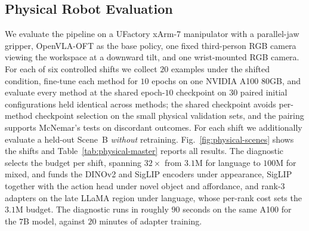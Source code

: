 

\subsection{Physical Robot Evaluation}
\label{sec:exp-physical}

We evaluate the pipeline on a UFactory xArm-7 manipulator with a parallel-jaw gripper, OpenVLA-OFT as the base policy, one fixed third-person RGB camera viewing the workspace at a downward tilt, and one wrist-mounted RGB camera.
For each of six controlled shifts we collect $20$ examples under the shifted condition, fine-tune each method for $10$ epochs on one NVIDIA A100 80GB, and evaluate every method at the shared epoch-$10$ checkpoint on $30$ paired initial configurations held identical across methods; the shared checkpoint avoids per-method checkpoint selection on the small physical validation sets, and the pairing supports McNemar's tests on discordant outcomes.
For each shift we additionally evaluate a held-out Scene~B \emph{without} retraining.
Fig.~\ref{fig:physical-scenes} shows the shifts and Table~\ref{tab:physical-master} reports all results.
The diagnostic selects the budget per shift, spanning $32\times$ from $3.1$M for language to $100$M for mixed, and funds the DINOv2 and SigLIP encoders under appearance, SigLIP together with the action head under novel object and affordance, and rank-$3$ adapters on the late LLaMA region under language, whose per-rank cost sets the $3.1$M budget.
The diagnostic runs in roughly $90$ seconds on the same A100 for the $7$B model, against $20$ minutes of adapter training.




